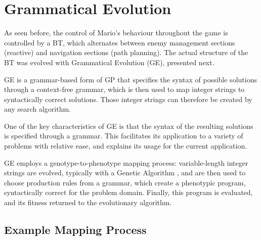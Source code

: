 \documentclass[conference]{IEEEtran}
\begin{document}
\begin{itemize}

\end{itemize}

\section{Grammatical Evolution}\label{GE}

As seen before, the control of Mario's behaviour throughout the game is
controlled by a BT, which alternates between enemy management sections
(reactive) and navigation sections (path planning). The actual structure of the
BT was evolved with Grammatical Evolution \cite{OR03} (GE), presented next.

GE is a grammar-based form of GP \cite{MNW10} that specifies the syntax of
possible solutions through a context-free grammar, which is then used to map
integer strings to syntactically correct solutions. Those integer strings can
therefore be created by any search algorithm.

One of the key characteristics of GE is that the syntax of the resulting
solutions is specified through a grammar. This facilitates its application to a
variety of problems with relative ease, and explains its usage for the current
application.

GE employs a genotype-to-phenotype mapping process: variable-length integer
strings are evolved, typically with a Genetic Algorithm \cite{Gol89}, and
are then used to choose production rules from a grammar, which create a phenotypic
program, syntactically correct for the problem domain. Finally, this program is
evaluated, and its fitness returned to the evolutionary algorithm.

\subsection{Example Mapping Process}
\end{document}
